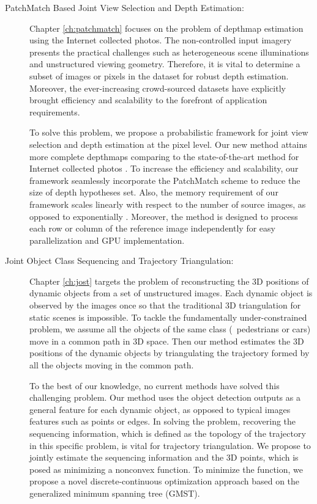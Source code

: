 \begin{description}

\item[PatchMatch Based Joint View Selection and Depth Estimation:]
Chapter \ref{ch:patchmatch} focuses on the problem of depthmap estimation using the Internet collected photos. The non-controlled input imagery presents the practical challenges such as heterogeneous scene illuminations and unstructured viewing geometry.
Therefore, it is vital to determine a subset of images or pixels in the dataset for robust depth estimation. Moreover, the ever-increasing crowd-sourced datasets have explicitly brought
efficiency and scalability to the forefront of application requirements.

To solve this problem, we propose a probabilistic framework for joint view selection and depth estimation at the pixel level. Our new method attains more complete depthmaps comparing to the state-of-the-art method for Internet collected photos \cite{Goesele07}. 
To increase the efficiency and scalability, our framework seamlessly incorporate the PatchMatch scheme \cite{patchMatchStereo1} to  reduce the size of depth hypotheses set. Also, the memory requirement of our framework scales linearly with respect to the number of source images, as opposed to exponentially \cite{CombinedDepthOutlier}. 
Moreover, the method is designed to process each row or column of the reference image independently for easy parallelization and GPU implementation.

\item[Joint Object Class Sequencing and Trajectory Triangulation:]
Chapter \ref{ch:jost} targets the problem of reconstructing the 3D positions of dynamic objects from a set of unstructured images. Each dynamic object is observed by the images once so that the traditional 3D triangulation for static scenes is impossible. To tackle the fundamentally under-constrained problem, we assume all the objects of the same class (\eg~pedestrians or cars) move in a common path in 3D space. Then our method estimates the 3D positions of the dynamic objects by triangulating the trajectory formed by all the objects moving in the common path. 

To the best of our knowledge, no current methods have solved this challenging problem. 
Our method uses the object detection outputs as a general feature for each dynamic object, as opposed to typical images features such as points or edges. In solving the problem, recovering the sequencing information, which is defined as the topology of the trajectory in this specific problem, is vital for trajectory triangulation. We propose to jointly estimate the sequencing information and the 3D points, which is posed as minimizing a nonconvex function. To minimize the function, we propose a novel discrete-continuous optimization approach based on the generalized minimum spanning tree (GMST). 


\end{description}
